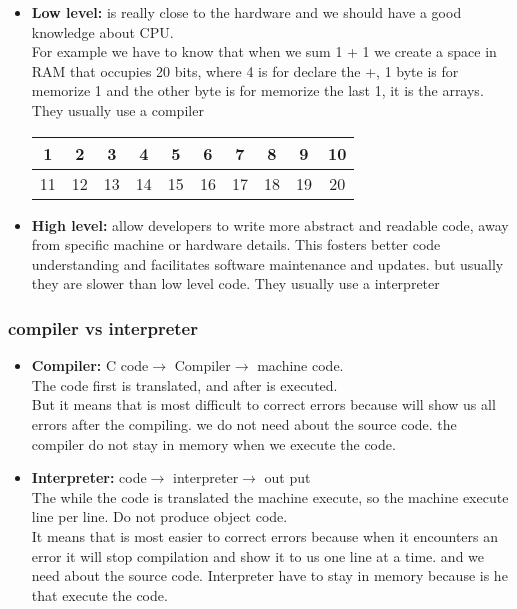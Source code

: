         \begin{itemize}
            \item \textbf{Low level:} is really close to the hardware and we    should have a good knowledge about CPU.
               \\
                For example we have to know that when we sum 1 + 1 we create a space in RAM that occupies 20 bits, where 4 is for declare the +, 1 byte is for memorize 1 and the other byte is for memorize the last 1, it is the arrays.
                They usually use a compiler
                \begin{center}
                    \begin{tabular}{|*{10}{c|}}
                        \hline
                        1 & 2 & 3 & 4 & 5 & 6 & 7 & 8 & 9 & 10 \\
                        \hline
                        11 & 12 & 13 & 14 & 15 & 16 & 17 & 18 & 19 & 20 \\
                        \hline
                    \end{tabular}
                \end{center}
            \item \textbf{High level:} allow developers to write more abstract and readable code, away from specific machine or hardware details. This fosters better code understanding and facilitates software maintenance and updates. but usually they are slower than low level code.
            They usually use a interpreter
            
        \end{itemize}
        \subsubsection{compiler vs interpreter}
            \begin{itemize}
                \item \textbf{Compiler:} C code$\rightarrow $ Compiler$ \rightarrow$ machine code. 
                \\ The code first is translated, and after is executed.
                \\But it means that is most difficult to correct errors because will show us all errors after the compiling. we do not need about the source code. the compiler do not stay in memory when we execute the code.

                \item \textbf{Interpreter: } code$\rightarrow $ interpreter$ \rightarrow$ out put 
                \\The while the code is translated the machine execute, so the machine execute line per line. Do not produce object code.
                \\It means that is most easier to correct errors because when it encounters an error it will stop compilation and show it to us one line at a time. and we need about the source code. Interpreter have to stay in memory because is he that execute the code.
                
            \end{itemize}
        
